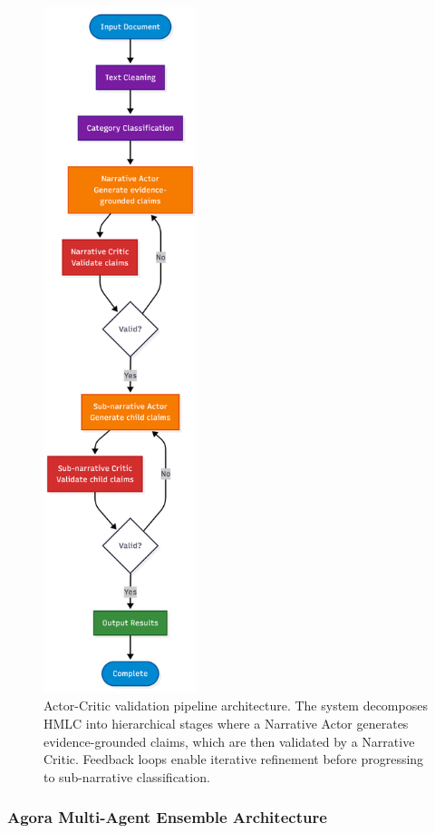 \begin{figure}[!ht]
\centering
\includegraphics[height=20cm]{assets/diagrams/actor-critique.png}
\caption{Actor-Critic validation pipeline architecture. The system decomposes HMLC into hierarchical stages where a Narrative Actor generates evidence-grounded claims, which are then validated by a Narrative Critic. Feedback loops enable iterative refinement before progressing to sub-narrative classification.}
\label{fig:actor_critic_pipeline}
\end{figure}

\subsubsection{Agora Multi-Agent Ensemble Architecture}

